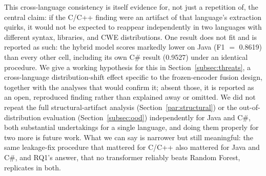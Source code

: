 \documentclass{ieeeaccess}
\begin{document}
This cross-language consistency is itself evidence for, not just a repetition of, the central claim: if the C/C++ finding were an artifact of that language's extraction quirks, it would not be expected to reappear independently in two languages with different syntax, libraries, and CWE distributions. One result does not fit and is reported as such: the hybrid model scores markedly lower on Java (F1 $=$ 0.8619) than every other cell, including its own C\# result (0.9527) under an identical procedure. We give a working hypothesis for this in Section~\ref{subsec:threats}, a cross-language distribution-shift effect specific to the frozen-encoder fusion design, together with the analyses that would confirm it; absent those, it is reported as an open, reproduced finding rather than explained away or omitted. We did not repeat the full structural-artifact analysis (Section~\ref{par:structural}) or the out-of-distribution evaluation (Section~\ref{subsec:ood}) independently for Java and C\#, both substantial undertakings for a single language, and doing them properly for two more is future work. What we can say is narrower but still meaningful: the same leakage-fix procedure that mattered for C/C++ also mattered for Java and C\#, and RQ1's answer, that no transformer reliably beats Random Forest, replicates in both.
\end{document}
